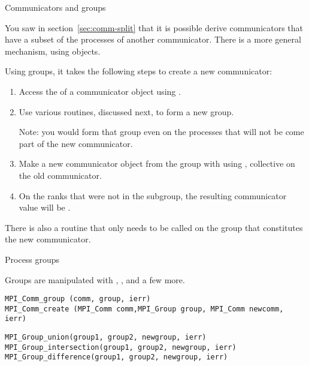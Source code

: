 
 {Communicators and groups}
\label{sec:mpi-comm-group}

You saw in section~\ref{sec:comm-split} that it is possible derive
communicators that have a subset of the processes of another communicator.
There is a more general mechanism, using 
objects.

Using groups, it takes the following steps to create a new communicator:
\begin{enumerate}
\item Access the  of a communicator
  object using .
\item Use various routines, discussed next, to form a new group.

  Note: you would form that group even on the processes that will not
  be come part of the new communicator.
\item Make a new communicator object from the group with using
  , collective on the old communicator.
\item On the ranks that were not in the subgroup, the resulting
  communicator value will be .
\end{enumerate}

There is also a routine  that only
needs to be called on the group that constitutes the new communicator.

 {Process groups}
\label{sec:comm-group}

Groups are manipulated with
,
,
 and a few more.

\begin{lstlisting}
MPI_Comm_group (comm, group, ierr)
MPI_Comm_create (MPI_Comm comm,MPI_Group group, MPI_Comm newcomm, ierr)
\end{lstlisting}

\begin{lstlisting}
MPI_Group_union(group1, group2, newgroup, ierr)
MPI_Group_intersection(group1, group2, newgroup, ierr)
MPI_Group_difference(group1, group2, newgroup, ierr)
\end{lstlisting}

